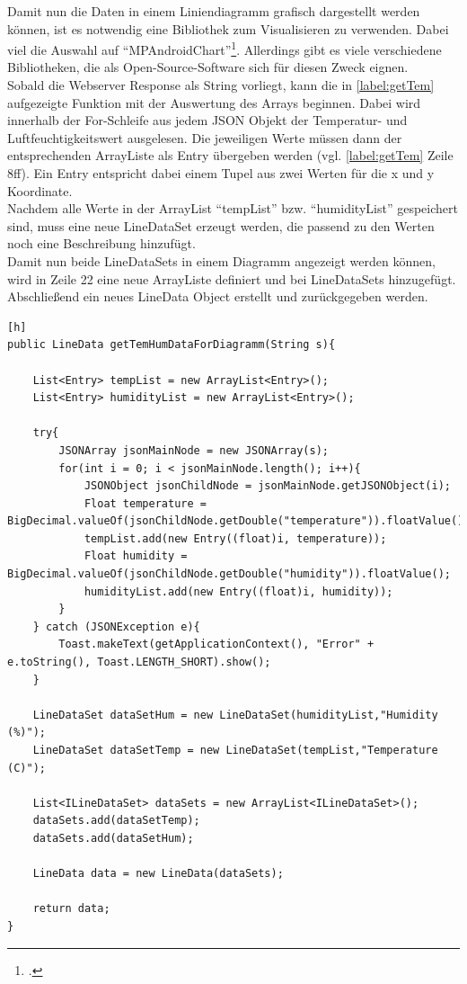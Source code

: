 Damit nun die Daten in einem Liniendiagramm grafisch dargestellt werden können, ist es notwendig eine Bibliothek zum Visualisieren zu verwenden. Dabei viel die Auswahl auf \enquote{MPAndroidChart}\footcite{https://github.com/PhilJay/MPAndroidChart}. Allerdings gibt es viele verschiedene Bibliotheken, die als Open-Source-Software sich für diesen Zweck eignen.\\
Sobald die Webserver Response als String vorliegt, kann die in \autoref{label:getTem} aufgezeigte Funktion mit der Auswertung des Arrays beginnen. Dabei wird innerhalb der For-Schleife aus jedem \ac{JSON} Objekt der Temperatur- und Luftfeuchtigkeitswert ausgelesen. Die jeweiligen Werte müssen dann der entsprechenden ArrayListe als Entry übergeben werden (vgl. \autoref{label:getTem} Zeile 8ff). Ein Entry entspricht dabei einem Tupel aus zwei Werten für die x und y Koordinate.\\Nachdem alle Werte in der ArrayList \enquote{tempList} bzw. \enquote{humidityList} gespeichert sind, muss eine neue LineDataSet erzeugt werden, die passend zu den Werten noch eine Beschreibung hinzufügt. \\
Damit nun beide LineDataSets in einem Diagramm angezeigt werden können, wird in Zeile 22 eine neue ArrayListe definiert und bei LineDataSets hinzugefügt. Abschließend ein neues LineData Object erstellt und zurückgegeben werden. 

\begin{lstlisting}[label=label:getTem][h]
public LineData getTemHumDataForDiagramm(String s){

	List<Entry> tempList = new ArrayList<Entry>();
	List<Entry> humidityList = new ArrayList<Entry>();
	
	try{
		JSONArray jsonMainNode = new JSONArray(s);
		for(int i = 0; i < jsonMainNode.length(); i++){
			JSONObject jsonChildNode = jsonMainNode.getJSONObject(i);
			Float temperature = BigDecimal.valueOf(jsonChildNode.getDouble("temperature")).floatValue();
			tempList.add(new Entry((float)i, temperature));
			Float humidity = BigDecimal.valueOf(jsonChildNode.getDouble("humidity")).floatValue();
			humidityList.add(new Entry((float)i, humidity));
		}
	} catch (JSONException e){
		Toast.makeText(getApplicationContext(), "Error" + e.toString(), Toast.LENGTH_SHORT).show();
	}
	
	LineDataSet dataSetHum = new LineDataSet(humidityList,"Humidity (%)");	
	LineDataSet dataSetTemp = new LineDataSet(tempList,"Temperature (C)");
		
	List<ILineDataSet> dataSets = new ArrayList<ILineDataSet>();
	dataSets.add(dataSetTemp);
	dataSets.add(dataSetHum);
	
	LineData data = new LineData(dataSets);
	
	return data;
}
\end{lstlisting}

